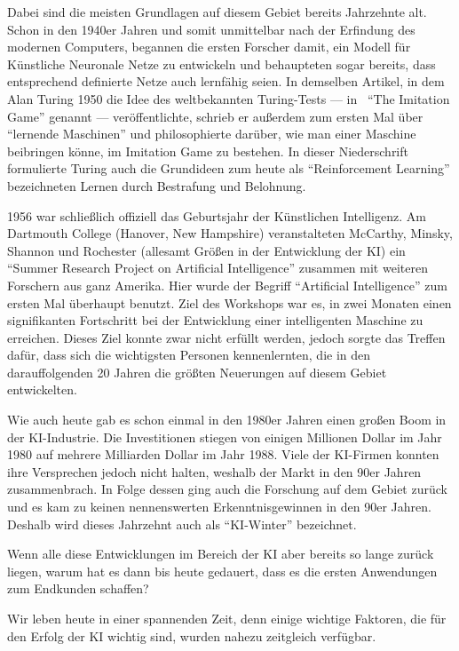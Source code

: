 Dabei sind die meisten Grundlagen auf diesem Gebiet bereits Jahrzehnte alt. Schon in den 1940er Jahren und somit unmittelbar nach der Erfindung des modernen Computers, begannen die ersten Forscher damit, ein Modell für Künstliche Neuronale Netze zu entwickeln und behaupteten sogar bereits, dass entsprechend definierte Netze auch lernfähig seien. In demselben Artikel, in dem Alan Turing 1950 die Idee des weltbekannten Turing-Tests --- in~\cite{TURING.1950} "`The Imitation Game"' genannt --- veröffentlichte, schrieb er außerdem zum ersten Mal über "`lernende Maschinen"' und philosophierte darüber, wie man einer Maschine beibringen könne, im Imitation Game zu bestehen. In dieser Niederschrift formulierte Turing auch die Grundideen zum heute als "`Reinforcement Learning"' bezeichneten Lernen durch Bestrafung und Belohnung.

1956 war schließlich offiziell das Geburtsjahr der Künstlichen Intelligenz. Am Dartmouth College (Hanover, New Hampshire) veranstalteten McCarthy, Minsky, Shannon und Rochester (allesamt Größen in der Entwicklung der \gls{KI}) ein "`Summer Research Project on Artificial Intelligence"' zusammen mit weiteren Forschern aus ganz Amerika. Hier wurde der Begriff "`Artificial Intelligence"' zum ersten Mal überhaupt benutzt. Ziel des Workshops war es, in zwei Monaten einen signifikanten Fortschritt bei der Entwicklung einer intelligenten Maschine zu erreichen. Dieses Ziel konnte zwar nicht erfüllt werden, jedoch sorgte das Treffen dafür, dass sich die wichtigsten Personen kennenlernten, die in den darauffolgenden 20 Jahren die größten Neuerungen auf diesem Gebiet entwickelten.

Wie auch heute gab es schon einmal in den 1980er Jahren einen großen Boom in der KI-Industrie. Die Investitionen stiegen von einigen Millionen Dollar im Jahr 1980 auf mehrere Milliarden Dollar im Jahr 1988. Viele der \gls{KI}-Firmen konnten ihre Versprechen jedoch nicht halten, weshalb der Markt in den 90er Jahren zusammenbrach. In Folge dessen ging auch die Forschung auf dem Gebiet zurück und es kam zu keinen nennenswerten Erkenntnisgewinnen in den 90er Jahren. Deshalb wird dieses Jahrzehnt auch als "`\gls{KI}-Winter"' bezeichnet.

Wenn alle diese Entwicklungen im Bereich der \gls{KI} aber bereits so lange zurück liegen, warum hat es dann bis heute gedauert, dass es die ersten Anwendungen zum Endkunden schaffen?

Wir leben heute in einer spannenden Zeit, denn einige wichtige Faktoren, die für den Erfolg der \gls{KI} wichtig sind, wurden nahezu zeitgleich verfügbar.

